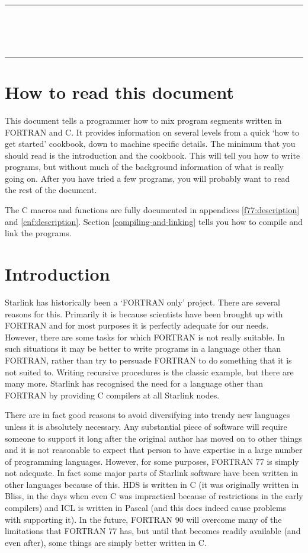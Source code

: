 \null\vspace {5mm}
\begin {center}
\rule{80mm}{0.5mm} \\ [1ex]
{\Large\bf \stardoctitle \\ [2.5ex]
           \stardocversion} \\ [2ex]
\rule{80mm}{0.5mm}
\end{center}
\vspace{30mm}

\section{How to read this document}
\label{how-to}

This document tells a programmer how to mix program segments written in FORTRAN
and C. It provides information on several levels from a quick `how to get
started' cookbook, down to machine specific details. The minimum that you
should read is the introduction and the cookbook. This will tell you how to
write programs, but without much of the background information of what is
really going on. After you have tried a few programs, you will probably want to
read the rest of the document.

The C macros and functions are fully documented in appendices
\ref{f77:description} and \ref{cnf:description}. Section
\ref{compiling-and-linking} tells you how to compile and link the programs.

\section{Introduction}
\label{intro}

Starlink has historically been a `FORTRAN only' project. There are several
reasons for this. Primarily it is because scientists have been brought up with
FORTRAN and for most purposes it is perfectly adequate for our needs. However,
there are some tasks for which FORTRAN is not really suitable. In such
situations it may be better to write programs in a language other than FORTRAN,
rather than try to persuade FORTRAN to do something that it is not suited to.
Writing recursive procedures is the classic example, but there are many more.
Starlink has recognised the need for a language other than FORTRAN by providing
C compilers at all Starlink nodes. 

There are in fact good reasons to avoid diversifying into trendy new languages
unless it is absolutely necessary. Any substantial piece of software will
require someone to support it long after the original author has moved on to
other things and it is not reasonable to expect that person to have expertise
in a large number of programming languages. However, for some purposes, FORTRAN
77 is simply not adequate. In fact some major parts of Starlink software have
been written in other languages because of this. HDS is written in C (it was
originally written in Bliss, in the days when even C was impractical because of
restrictions in the early compilers) and ICL is written in Pascal (and this does
indeed cause problems with supporting it). In the future, FORTRAN 90 will
overcome many of the limitations that FORTRAN 77 has, but until that becomes
readily available (and even after), some things are simply better written in C.


